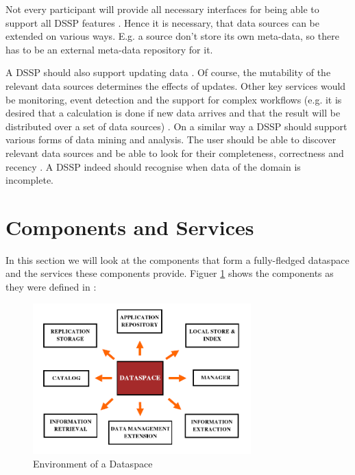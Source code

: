 Not every participant will provide all necessary interfaces for being able to support all DSSP features \cite[p. 29]{Franklin:2005:DDN:1107499.1107502}. Hence it is necessary, that data sources can be extended on various ways. E.g. a source don't store its own meta-data, so there has to be an external meta-data repository for it. 

A DSSP should also support updating data \cite[p. 29]{Franklin:2005:DDN:1107499.1107502}. Of course, the mutability of the relevant data sources determines the effects of updates.  
Other key services would be monitoring, event detection and the support for complex workflows (e.g. it is desired that a calculation is done if new data arrives and that the result will be distributed over a set of data sources) \cite[p. 29]{Franklin:2005:DDN:1107499.1107502}. On a similar way a DSSP should support various forms of data mining and analysis. 
The user should be able to discover relevant data sources and be able to look for their 	 completeness, correctness and recency \cite[p. 29]{Franklin:2005:DDN:1107499.1107502}. A DSSP indeed should recognise when data of the domain is incomplete. 

\section{Components and Services}

In this section we will look at the components that form a fully-fledged dataspace and the services these components provide. Figuer \ref{TowardsRealizationOfDataspacesEnvironment} shows the components as they were defined in \cite{1698348}:


\begin{figure}[H]
	\begin{center}
		\includegraphics[width=0.75\textwidth]{figures/TowardsRealizationOfDataspaces1.png}
	\end{center}
	\caption{Environment of  a Dataspace \cite[p. 2]{1698348}}
	\label{TowardsRealizationOfDataspacesEnvironment}
\end{figure}

